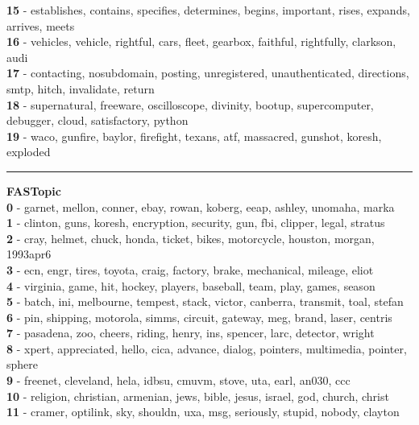\textbf{15} - establishes, contains, specifies, determines, begins, important, rises, expands, arrives, meets\\
\textbf{16} - vehicles, vehicle, rightful, cars, fleet, gearbox, faithful, rightfully, clarkson, audi\\
\textbf{17} - contacting, nosubdomain, posting, unregistered, unauthenticated, directions, smtp, hitch, invalidate, return\\
\textbf{18} - supernatural, freeware, oscilloscope, divinity, bootup, supercomputer, debugger, cloud, satisfactory, python\\
\textbf{19} - waco, gunfire, baylor, firefight, texans, atf, massacred, gunshot, koresh, exploded\\
\hrule\vspace{2mm}
\noindent
\textbf{FASTopic}\vspace{2mm}\\
\vspace{2mm}
\noindent
\textbf{0} - garnet, mellon, conner, ebay, rowan, koberg, eeap, ashley, unomaha, marka\\
\textbf{1} - clinton, guns, koresh, encryption, security, gun, fbi, clipper, legal, stratus\\
\textbf{2} - cray, helmet, chuck, honda, ticket, bikes, motorcycle, houston, morgan, 1993apr6\\
\textbf{3} - ecn, engr, tires, toyota, craig, factory, brake, mechanical, mileage, eliot\\
\textbf{4} - virginia, game, hit, hockey, players, baseball, team, play, games, season\\
\textbf{5} - batch, ini, melbourne, tempest, stack, victor, canberra, transmit, toal, stefan\\
\textbf{6} - pin, shipping, motorola, simms, circuit, gateway, meg, brand, laser, centris\\
\textbf{7} - pasadena, zoo, cheers, riding, henry, ins, spencer, larc, detector, wright\\
\textbf{8} - xpert, appreciated, hello, cica, advance, dialog, pointers, multimedia, pointer, sphere\\
\textbf{9} - freenet, cleveland, hela, idbsu, cmuvm, stove, uta, earl, an030, ccc\\
\textbf{10} - religion, christian, armenian, jews, bible, jesus, israel, god, church, christ\\
\textbf{11} - cramer, optilink, sky, shouldn, uxa, msg, seriously, stupid, nobody, clayton\\
